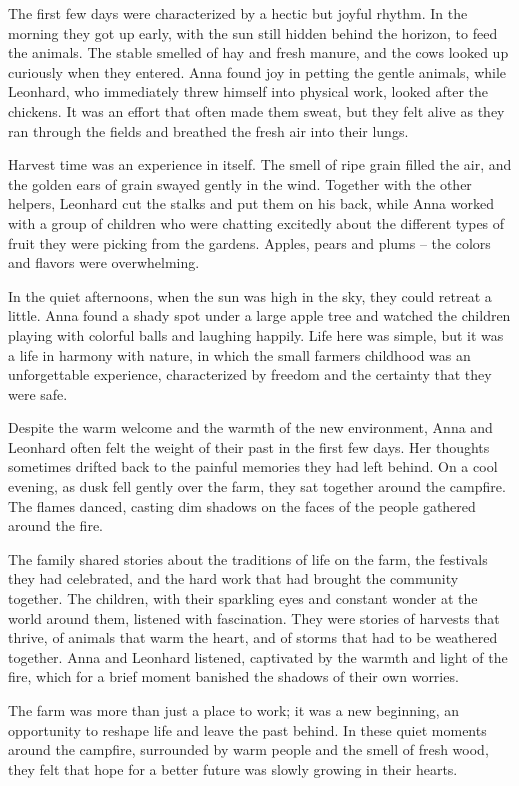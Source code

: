 \documentclass[
]{article}
\begin{document}
The first few days were characterized by a hectic but joyful rhythm. In
the morning they got up early, with the sun still hidden behind the
horizon, to feed the animals. The stable smelled of hay and fresh
manure, and the cows looked up curiously when they entered. Anna found
joy in petting the gentle animals, while Leonhard, who immediately threw
himself into physical work, looked after the chickens. It was an effort
that often made them sweat, but they felt alive as they ran through the
fields and breathed the fresh air into their lungs.

Harvest time was an experience in itself. The smell of ripe grain filled
the air, and the golden ears of grain swayed gently in the wind.
Together with the other helpers, Leonhard cut the stalks and put them on
his back, while Anna worked with a group of children who were chatting
excitedly about the different types of fruit they were picking from the
gardens. Apples, pears and plums -- the colors and flavors were
overwhelming.

In the quiet afternoons, when the sun was high in the sky, they could
retreat a little. Anna found a shady spot under a large apple tree and
watched the children playing with colorful balls and laughing happily.
Life here was simple, but it was a life in harmony with nature, in which
the small farmers\textquotesingle{} childhood was an unforgettable
experience, characterized by freedom and the certainty that they were
safe.

Despite the warm welcome and the warmth of the new environment, Anna and
Leonhard often felt the weight of their past in the first few days. Her
thoughts sometimes drifted back to the painful memories they had left
behind. On a cool evening, as dusk fell gently over the farm, they sat
together around the campfire. The flames danced, casting dim shadows on
the faces of the people gathered around the fire.

The family shared stories about the traditions of life on the farm, the
festivals they had celebrated, and the hard work that had brought the
community together. The children, with their sparkling eyes and constant
wonder at the world around them, listened with fascination. They were
stories of harvests that thrive, of animals that warm the heart, and of
storms that had to be weathered together. Anna and Leonhard listened,
captivated by the warmth and light of the fire, which for a brief moment
banished the shadows of their own worries.

The farm was more than just a place to work; it was a new beginning, an
opportunity to reshape life and leave the past behind. In these quiet
moments around the campfire, surrounded by warm people and the smell of
fresh wood, they felt that hope for a better future was slowly growing
in their hearts.
\end{document}
